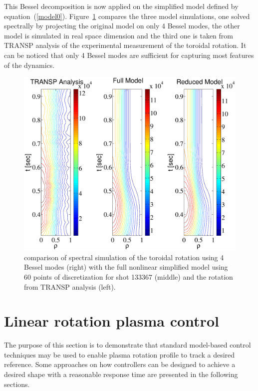 \documentclass[12pt]{iopart}
\begin{document}
This Bessel decomposition is now applied on the simplified model defined by equation~(\ref{model0}). Figure~\ref{bessel1} compares the three model simulations, one solved spectrally by projecting the original model on only 4 Bessel modes, the other model is simulated in real space dimension and the third one is taken from TRANSP analysis of the experimental measurement of the toroidal rotation. It can be noticed that only 4 Bessel modes are sufficient for capturing most features of the dynamics.
\begin{figure}
\includegraphics[width=\linewidth]{imene_figs/bessel11} %
\caption{comparison of spectral simulation of the toroidal rotation using 4 Bessel modes (right) with the full nonlinear simplified model using 60 points of discretization for shot 133367 (middle) and the rotation from TRANSP analysis (left). }
\label{bessel1}
\end{figure}

\section{Linear rotation plasma control}
 \label{LRPC}
 
 The purpose of this section is to demonstrate that standard model-based control techniques may be used to enable plasma rotation profile to track a desired reference. Some approaches on how controllers can be designed to achieve a desired shape with a reasonable response time are presented in the following sections.
 
\end{document}
